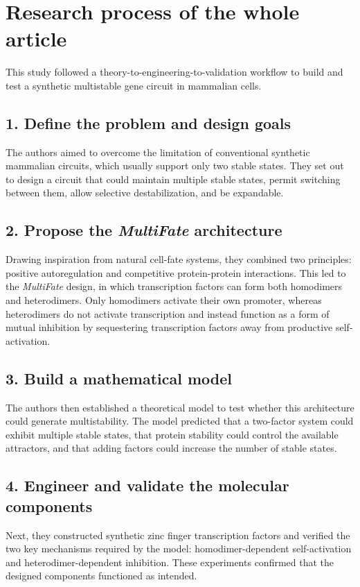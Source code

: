 \documentclass[12pt,a4paper]{article}
\begin{document}
\maketitle

\section{Research process of the whole article}

This study followed a theory-to-engineering-to-validation workflow to build and test a synthetic multistable gene circuit in mammalian cells.

\subsection*{1. Define the problem and design goals}
The authors aimed to overcome the limitation of conventional synthetic mammalian circuits, which usually support only two stable states. They set out to design a circuit that could maintain multiple stable states, permit switching between them, allow selective destabilization, and be expandable.

\subsection*{2. Propose the \textit{MultiFate} architecture}
Drawing inspiration from natural cell-fate systems, they combined two principles: positive autoregulation and competitive protein-protein interactions. This led to the \textit{MultiFate} design, in which transcription factors can form both homodimers and heterodimers. Only homodimers activate their own promoter, whereas heterodimers do not activate transcription and instead function as a form of mutual inhibition by sequestering transcription factors away from productive self-activation.

\subsection*{3. Build a mathematical model}
The authors then established a theoretical model to test whether this architecture could generate multistability. The model predicted that a two-factor system could exhibit multiple stable states, that protein stability could control the available attractors, and that adding factors could increase the number of stable states.

\subsection*{4. Engineer and validate the molecular components}
Next, they constructed synthetic zinc finger transcription factors and verified the two key mechanisms required by the model: homodimer-dependent self-activation and heterodimer-dependent inhibition. These experiments confirmed that the designed components functioned as intended.
\end{document}
